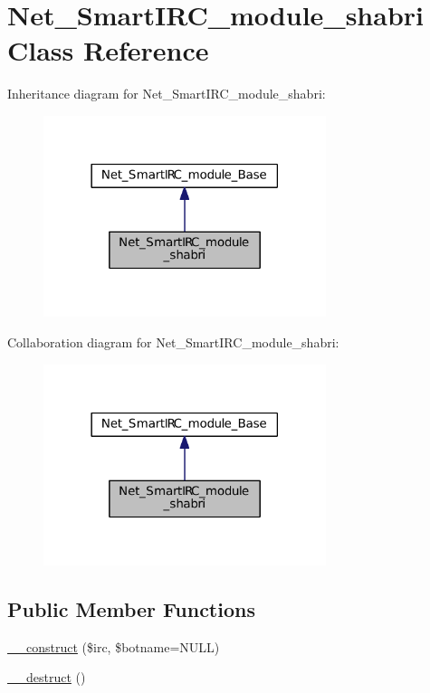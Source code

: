 \hypertarget{classNet__SmartIRC__module__shabri}{}\section{Net\+\_\+\+Smart\+I\+R\+C\+\_\+module\+\_\+shabri Class Reference}
\label{classNet__SmartIRC__module__shabri}


Inheritance diagram for Net\+\_\+\+Smart\+I\+R\+C\+\_\+module\+\_\+shabri\+:
\nopagebreak
\begin{figure}[H]
\begin{center}
\leavevmode
\includegraphics[width=234pt]{d5/d63/classNet__SmartIRC__module__shabri__inherit__graph}
\end{center}
\end{figure}


Collaboration diagram for Net\+\_\+\+Smart\+I\+R\+C\+\_\+module\+\_\+shabri\+:
\nopagebreak
\begin{figure}[H]
\begin{center}
\leavevmode
\includegraphics[width=234pt]{d4/d39/classNet__SmartIRC__module__shabri__coll__graph}
\end{center}
\end{figure}
\subsection*{Public Member Functions}
\begin{DoxyCompactItemize}
\item 
\hyperlink{classNet__SmartIRC__module__shabri_a7a24876dd51e61a1c5e83dab776ef3b0}{\+\_\+\+\_\+construct} (\$irc, \$botname=N\+U\+LL)
\item 
\hyperlink{classNet__SmartIRC__module__shabri_ad51f5f82743d89efbe3c611d65757f0b}{\+\_\+\+\_\+destruct} ()
\end{DoxyCompactItemize}
